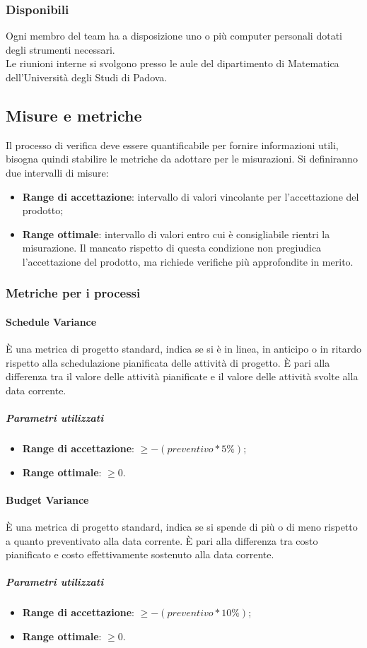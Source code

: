 \documentclass[../PianoDiQualifica.tex]{subfiles}
\begin{document}
			\subsubsection{Disponibili}
				Ogni membro del team ha a disposizione uno o più computer personali
				dotati degli strumenti necessari.\\
				Le riunioni interne si svolgono presso le aule del dipartimento di
				Matematica dell'Università degli Studi di Padova.
		\subsection{Misure e metriche}
			Il processo di verifica deve essere quantificabile per fornire informazioni
			utili, bisogna quindi stabilire le metriche da adottare per le misurazioni.
			Si definiranno due intervalli di misure:
			\begin{itemize}
				\item \textbf{Range di accettazione}: intervallo di valori vincolante per
				l'accettazione del prodotto;
				\item \textbf{Range ottimale}: intervallo di valori entro cui è
				consigliabile rientri la misurazione. Il mancato rispetto di questa
				condizione non pregiudica l'accettazione del prodotto, ma richiede
				verifiche più approfondite in merito.
			\end{itemize}
			\subsubsection{Metriche per i processi}
				\paragraph{Schedule Variance\\}
					È una metrica di progetto standard, indica se si è in linea, in
					anticipo o in ritardo rispetto alla schedulazione pianificata delle
					attività di progetto. È pari alla differenza tra il valore delle
					attività pianificate e il valore delle attività svolte alla data
					corrente.
					\subparagraph{Parametri utilizzati}
						\begin{itemize}
							\item \textbf{Range di accettazione}: $\geq -(preventivo*5\%)$;
							\item \textbf{Range ottimale}: $\geq 0$.
						\end{itemize}
				\paragraph{Budget Variance\\}
					È una metrica di progetto standard, indica se si spende di più o di
					meno rispetto a quanto preventivato alla data corrente. È pari alla
					differenza tra costo pianificato e costo effettivamente sostenuto
					alla data corrente.
					\subparagraph{Parametri utilizzati}
						\begin{itemize}
							\item \textbf{Range di accettazione}: $\geq -(preventivo*10\%)$;
							\item \textbf{Range ottimale}: $\geq 0$.
						\end{itemize}
\end{document}
